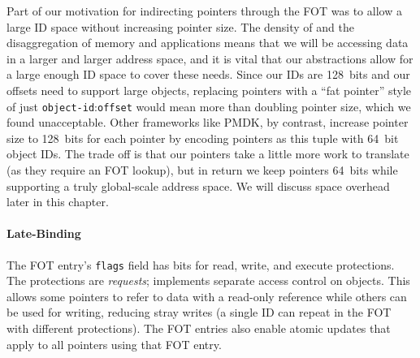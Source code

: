 Part of our motivation for indirecting pointers through the FOT was to allow a large ID space
without increasing pointer size. The density of \NVM and the disaggregation of memory and
applications means that we will be accessing data in a larger and larger address space, and it is
vital that our abstractions allow for a large enough ID space to cover these needs. Since our IDs
are 128~bits and our offsets need to support large objects, replacing pointers with a ``fat
pointer'' style of just \texttt{object-id}:\texttt{offset} would mean more than doubling pointer
size, which we found unacceptable. Other frameworks like PMDK, by contrast, increase pointer size to 128~bits for each
pointer by encoding pointers as this tuple with 64~bit object IDs. The trade off is that our
pointers take a little more work to translate (as they require an FOT lookup), but in return we keep
pointers 64~bits while supporting a truly global-scale address space. We will discuss space overhead later in this chapter.


\paragraph{Late-Binding}

The FOT entry's \texttt{flags} field has bits for read, write, and execute protections. The
protections are \textit{requests}; \Twizzler implements separate access control on objects.
This allows some pointers to refer to data with a read-only reference while others can be used for
writing, reducing stray writes (a single ID can repeat in the FOT with different protections).
The FOT entries also enable atomic updates that apply to all pointers using
that FOT entry.

